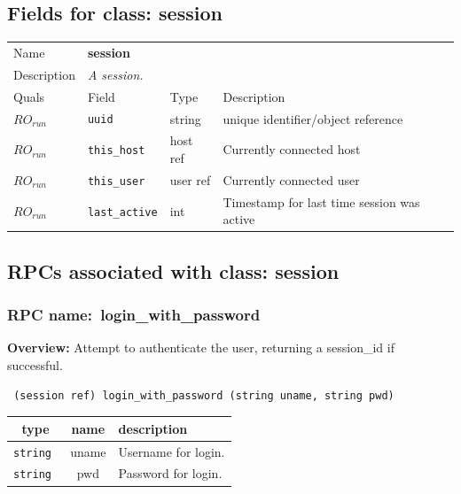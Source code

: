 \subsection{Fields for class: session}
\begin{longtable}{|lllp{}|}
\hline
\multicolumn{1}{|l}{Name} & \multicolumn{3}{l|}{\bf session} \\
\multicolumn{1}{|l}{Description} & \multicolumn{3}{l|}{\parbox{11cm}{\em A
session.}} \\
\hline
Quals & Field & Type & Description \\
\hline
$\mathit{RO}_\mathit{run}$ &  {\tt uuid} & string & unique identifier/object reference \\
$\mathit{RO}_\mathit{run}$ &  {\tt this\_host} & host ref & Currently connected host \\
$\mathit{RO}_\mathit{run}$ &  {\tt this\_user} & user ref & Currently connected user \\
$\mathit{RO}_\mathit{run}$ &  {\tt last\_active} & int & Timestamp for last time session was active \\
\hline
\end{longtable}
\subsection{RPCs associated with class: session}
\subsubsection{RPC name:~login\_with\_password}

{\bf Overview:} 
Attempt to authenticate the user, returning a session\_id if successful.

\begin{verbatim} (session ref) login_with_password (string uname, string pwd)\end{verbatim}



 
\vspace{0.3cm}
\begin{tabular}{|c|c|p{7cm}|}
 \hline
{\bf type} & {\bf name} & {\bf description} \\ \hline
{\tt string } & uname & Username for login. \\ \hline 

{\tt string } & pwd & Password for login. \\ \hline 

\end{tabular}

